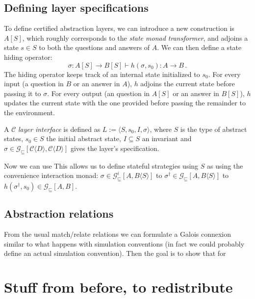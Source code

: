 \documentclass[format=sigplan,authordraft]{acmart}
\newcommand{\gcat}{\mathcal{G}_{\sqsubseteq}}
\begin{document}
\subsection{Defining layer specifications} %

To define certified abstraction layers,
we can introduce a new construction is $A[S]$,
which roughly corresponds to the \emph{state monad transformer},
and adjoins a state $s \in S$ to both the questions and answers of $A$.
We can then define a state hiding operator:
\[
    \sigma : A[S] \rightarrow B[S] \vdash
    h(\sigma, s_0) : A \rightarrow B \,.
\]
The hiding operator keeps track of an internal state
initialized to $s_0$.
For every input (a question in $B$ or an answer in $A$),
$h$ adjoins the current state before passing it to $\sigma$.
For every output (an question in $A[S]$ or an answer in $B[S]$),
$h$ updates the current state with the one provided
before passing the remainder to the environment.

A $\mathcal{C}$ \emph{layer interface} is defined as
$L := \langle S, s_0, I, \sigma \rangle$,
where $S$ is the type of abstract states,
$s_0 \in S$ the initial abstract state,
$I \subseteq S$ an invariant and
$\sigma \in
 \gcat[\mathcal{C}\langle D \rangle, \mathcal{C}\langle D \rangle]$
gives the layer's specification.



Now we can use 
This allows us to define stateful strategies
using $S$ as 
using the convenience interaction monad:
$\sigma \in \gcat^i[A, B \langle S \rangle]$
to $\sigma^\dagger \in \gcat[A, B \langle S \rangle]$
to $h(\sigma^\dagger, s_0) \in \gcat[A, B]$.


\subsection{Abstraction relations} %

From the usual match/relate relations
we can formulate a Galois connexion
similar to what happens with simulation conventions
(in fact we could probably define an actual simulation convention).
Then the goal is to show that for 








\newpage
\appendix
\section*{Stuff from before, to redistribute}
\end{document}
